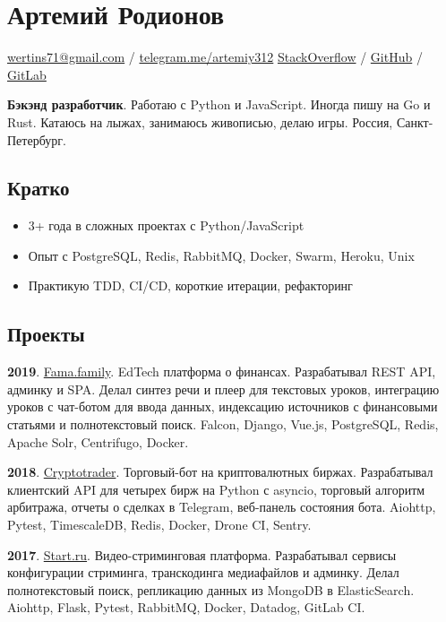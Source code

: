 \documentclass[12pt]{article}
\begin{document}
\section*{Артемий Родионов}

\href{mailto:wertins71@gmail.com}{wertins71@gmail.com} / \href{https://t.me/artemiy312}{telegram.me/artemiy312} \newline
\href{https://stackoverflow.com/users/6800156}{StackOverflow} /
\href{https://github.com/artemiy312}{GitHub} /
\href{https://gitlab.com/artemiy312}{GitLab}

\medskip\textbf{Бэкэнд разработчик}.
Работаю с Python и JavaScript.
\newline
Иногда пишу на Go и Rust.
Катаюсь на лыжах, занимаюсь живописью, делаю игры.
Россия, Санкт-Петербург.

\subsection*{Кратко}
\begin{itemize}
\item 3+ года в сложных проектах с Python/JavaScript
\item Опыт с PostgreSQL, Redis, RabbitMQ, Docker, Swarm, Heroku, Unix
\item Практикую TDD, CI/CD, короткие итерации, рефакторинг
\end{itemize}

\subsection*{Проекты}

\textbf{2019}. \href{https://app.fama.family/}{Fama.family}. EdTech платформа о финансах.
Разрабатывал REST API, админку и SPA.
Делал синтез речи и плеер для текстовых уроков, интеграцию уроков с чат-ботом для ввода данных, индексацию источников с финансовыми статьями и полнотекстовый поиск.
Falcon, Django, Vue.js, PostgreSQL, Redis, Apache Solr, Centrifugo, Docker.

\medskip
\textbf{2018}. \href{https://github.com/fidals/cryptotrader}{Cryptotrader}. Торговый-бот на криптовалютных биржах.
Разрабатывал клиентский API для четырех бирж на Python с asyncio, торговый алгоритм арбитража, отчеты о сделках в Telegram, веб-панель состояния бота.
Aiohttp, Pytest, TimescaleDB, Redis, Docker, Drone CI, Sentry.

\medskip
\textbf{2017}. \href{https://start.ru/}{Start.ru}. Видео-стриминговая платформа.
Разрабатывал сервисы конфигурации стриминга, транскодинга медиафайлов и админку.
Делал полнотекстовый поиск, репликацию данных из MongoDB в ElasticSearch.
Aiohttp, Flask, Pytest, RabbitMQ, Docker, Datadog, GitLab CI.
\end{document}
